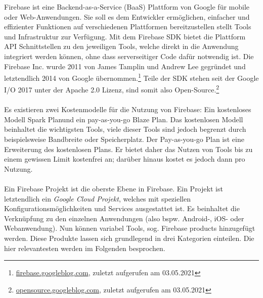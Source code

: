 Firebase ist eine Backend-as-a-Service (BaaS) Plattform von Google für mobile oder Web-Anwendungen. 
Sie soll es dem Entwickler ermöglichen, einfacher und effizienter Funktionen auf verschiedenen Plattformen bereitzustellen stellt Tools und Infrastruktur zur Verfügung.
Mit dem Firebase SDK bietet die Plattform API Schnittstellen zu den jeweiligen Tools, welche direkt in die Anwendung integriert werden können, ohne dass serverseitiger Code dafür notwendig ist.
Die Firebase Inc. wurde 2011 von James Tamplin und Andrew Lee gegründet und letztendlich 2014 von Google übernommen.\footnote{\href{https://firebase.googleblog.com/2014/10/firebase-is-joining-google.html}{firebase.googleblog.com}, zuletzt aufgerufen am 03.05.2021}
Teile der SDK stehen seit der Google I/O 2017 unter der Apache 2.0 Lizenz, sind somit also Open-Source.\footnote{\href{https://opensource.googleblog.com/2017/05/open-sourcing-firebase-sdks.html}{opensource.googleblog.com}, zuletzt aufgerufen am 03.05.2021}\\
\\
Es existieren zwei Kostenmodelle für die Nutzung von Firebase: Ein kostenloses Modell \glqq Spark Plan\grqq und ein pay-as-you-go \glqq Blaze Plan\grqq . Das kostenlosen Modell beinhaltet die wichtigsten Tools, viele dieser Tools sind jedoch begrenzt durch beispielsweise Bandbreite oder Speicherplatz.
Der Pay-as-you-go Plan ist eine Erweiterung des kostenlosen Plans. 
Er bietet daher das Nutzen von Tools bis zu einem gewissen Limit kostenfrei an; darüber hinaus kostet es jedoch dann pro Nutzung.\\
\\
Ein Firebase Projekt ist die oberste Ebene in Firebase. 
Ein Projekt ist letztendlich ein \textit{Google Cloud Projekt}, welches mit speziellen Konfigurationsmöglichkeiten und Services ausgestattet ist. 
Es beinhaltet die Verknüpfung zu den einzelnen Anwendungen (also bspw. Android-, iOS- oder Webanwendung). Nun können variabel Tools, sog. Firebase products hinzugefügt werden. Diese Produkte lassen sich grundlegend in drei Kategorien einteilen. Die hier relevantesten werden im Folgenden besprochen.\cite{firebase2021}

